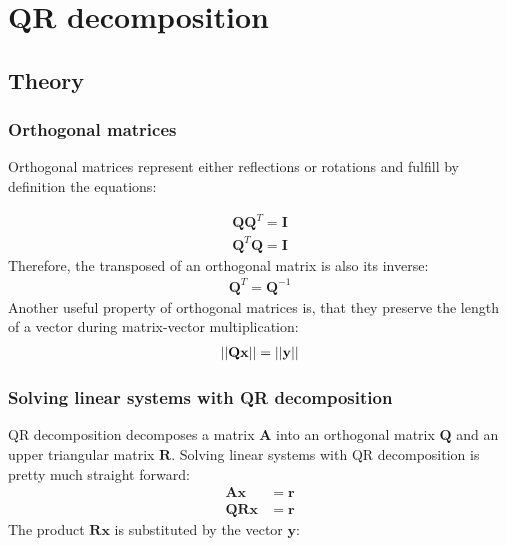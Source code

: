 \newpage
\section{QR decomposition}
\label{sec:QR}



\subsection{Theory}




\subsubsection{Orthogonal matrices}
\label{sec:orthogonalMatrices}

Orthogonal matrices represent either reflections or rotations and fulfill by definition the equations:

\begin{align}
\label{eq:definitionOrthogonal0}
\mathbf{Q}\mathbf{Q}^T = \mathbf{I}\\
\label{eq:definitionOrthogonal1}
\mathbf{Q}^T\mathbf{Q} = \mathbf{I}
\end{align}
%
Therefore, the transposed of an orthogonal matrix is also its inverse:
\begin{align}
\label{eq:orthogonalInverse}
\mathbf{Q}^T = \mathbf{Q}^{-1}
\end{align}
%
Another useful property of orthogonal matrices is, that they preserve the length of a vector during matrix-vector multiplication:
\begin{align}
\label{eq:orthogonalPreserveLength}
\left\vert\left\vert\mathbf{Qx}\right\vert\right\vert= \left\vert\left\vert\mathbf{y}\right\vert\right\vert
\end{align}




\subsubsection{Solving linear systems with QR decomposition}

QR decomposition decomposes a matrix $\mathbf{A}$ into an orthogonal matrix $\mathbf{Q}$ and an upper triangular matrix $\mathbf{R}$. 
Solving linear systems with QR decomposition is pretty much straight forward:
\begin{align}
\mathbf{A}\mathbf{x} &= \mathbf{r}\\
\mathbf{QR}\mathbf{x} &= \mathbf{r}
\end{align}
%
The product $\mathbf{R}\mathbf{x}$ is substituted by the vector $\mathbf{y}$:

